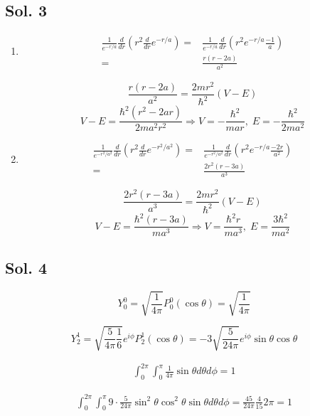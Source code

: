 \subsection*{Sol. 3}
\begin{enumerate}
    \item 
    \begin{align*}
        \frac{1}{e^{-r/a}}
        \frac{d}{dr}
        (r^2\frac{d}{dr}e^{-r/a})
        =&
        \frac{1}{e^{-r/a}}
        \frac{d}{dr}
        (
        r^2e^{-r/a}\frac{-1}{a}
        )\\
        =&
        \frac{r \left(r-2a\right)}{a^2}
    \end{align*}
    
    $$
    \frac{r \left(r-2a\right)}{a^2}
    =\frac{2mr^2}{\hbar^2}(V-E)
    $$
    $$
    V-E = \frac{\hbar^2(r^2-2ar)}{2ma^2r^2}
    \Rightarrow 
    V = 
    -\frac{\hbar^2}{mar},\;
    E = -\frac{\hbar^2}{2ma^2}
    $$
    \item 
        \begin{align*}
        \frac{1}{e^{-r^2/a^2}}
        \frac{d}{dr}
        (r^2\frac{d}{dr}e^{-r^2/a^2})
        =&
        \frac{1}{e^{-r^2/a^2}}
        \frac{d}{dr}
        (
        r^2e^{-r/a}\frac{-2r}{a^2}
        )\\
        =&
        \frac{2r^{2} \left(r - 3a\right)}{a^{3}}
    \end{align*}
    
    $$
    \frac{2r^{2} \left(r - 3a\right)}{a^{3}}
    =\frac{2mr^2}{\hbar^2}(V-E)
    $$
    $$
    V-E = \frac{\hbar^2(r-3a)}{ma^3}
    \Rightarrow 
    V = 
    \frac{\hbar^2 r}{ma^3},\;
    E = \frac{3\hbar^2}{ma^2}
    $$
    
    
\end{enumerate}

\subsection*{Sol. 4}
$$
Y^0_0 = 
\sqrt{\frac{1}{4\pi}}
P_0^0(\cos\theta)
=\sqrt{\frac{1}{4\pi}}
$$

$$
Y^1_2 = 
\sqrt{\frac{5}{4\pi}
\frac{1}{6}
}
e^{i\phi}
P_2^1(\cos\theta)
=-3\sqrt{\frac{5}{24\pi}}
e^{i\phi}
\sin\theta\cos\theta
$$

\begin{align*}
    \int_0^{2\pi} \int_0^{\pi}
    \frac{1}{4\pi}\sin\theta d\theta d\phi=1
\end{align*}

\begin{align*}
    \int_0^{2\pi} \int_0^{\pi}
    9\cdot \frac{5}{24\pi}
\sin^2\theta\cos^2\theta
\sin\theta 
d\theta d\phi=
\frac{45}{24\pi}\frac{4}{15}2\pi=1
\end{align*}

